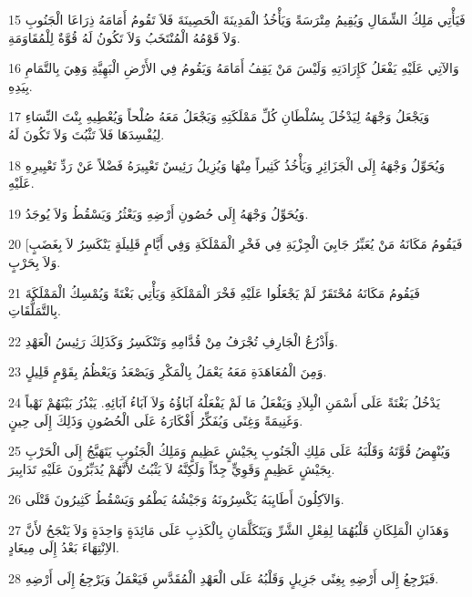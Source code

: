 \par 15 فَيَأْتِي مَلِكُ الشِّمَالِ وَيُقِيمُ مِتْرَسَةً وَيَأْخُذُ الْمَدِينَةَ الْحَصِينَةَ فَلاَ تَقُومُ أَمَامَهُ ذِرَاعَا الْجَنُوبِ وَلاَ قَوْمُهُ الْمُنْتَخَبُ وَلاَ تَكُونُ لَهُ قُوَّةٌ لِلْمُقَاوَمَةِ.
\par 16 وَالآتِي عَلَيْهِ يَفْعَلُ كَإِرَادَتِهِ وَلَيْسَ مَنْ يَقِفُ أَمَامَهُ وَيَقُومُ فِي الأَرْضِ الْبَهِيَّةِ وَهِيَ بِالتَّمَامِ بِيَدِهِ.
\par 17 وَيَجْعَلُ وَجْهَهُ لِيَدْخُلَ بِسُلْطَانِ كُلِّ مَمْلَكَتِهِ وَيَجْعَلُ مَعَهُ صُلْحاً وَيُعْطِيهِ بِنْتَ النِّسَاءِ لِيُفْسِدَهَا فَلاَ تَثْبُتَ وَلاَ تَكُونَ لَهُ.
\par 18 وَيُحَوِّلُ وَجْهَهُ إِلَى الْجَزَائِرِ وَيَأْخُذُ كَثِيراً مِنْهَا وَيُزِيلُ رَئِيسٌ تَعْيِيرَهُ فَضْلاً عَنْ رَدِّ تَعْيِيرِهِ عَلَيْهِ.
\par 19 وَيُحَوِّلُ وَجْهَهُ إِلَى حُصُونِ أَرْضِهِ وَيَعْثُرُ وَيَسْقُطُ وَلاَ يُوجَدُ.
\par 20 [فَيَقُومُ مَكَانَهُ مَنْ يُعَبِّرُ جَابِيَ الْجِزْيَةِ فِي فَخْرِ الْمَمْلَكَةِ وَفِي أَيَّامٍ قَلِيلَةٍ يَنْكَسِرُ لاَ بِغَضَبٍ وَلاَ بِحَرْبٍ.
\par 21 فَيَقُومُ مَكَانَهُ مُحْتَقَرٌ لَمْ يَجْعَلُوا عَلَيْهِ فَخْرَ الْمَمْلَكَةِ وَيَأْتِي بَغْتَةً وَيُمْسِكُ الْمَمْلَكَةَ بِالتَّمَلُّقَاتِ.
\par 22 وَأَذْرُعُ الْجَارِفِ تُجْرَفُ مِنْ قُدَّامِهِ وَتَنْكَسِرُ وَكَذَلِكَ رَئِيسُ الْعَهْدِ.
\par 23 وَمِنَ الْمُعَاهَدَةِ مَعَهُ يَعْمَلُ بِالْمَكْرِ وَيَصْعَدُ وَيَعْظُمُ بِقَوْمٍ قَلِيلٍ.
\par 24 يَدْخُلُ بَغْتَةً عَلَى أَسْمَنِ الْبِلاَدِ وَيَفْعَلُ مَا لَمْ يَفْعَلْهُ آبَاؤُهُ وَلاَ آبَاءُ آبَائِهِ. يَبْذُرُ بَيْنَهُمْ نَهْباً وَغَنِيمَةً وَغِنًى وَيُفَكِّرُ أَفْكَارَهُ عَلَى الْحُصُونِ وَذَلِكَ إِلَى حِينٍ.
\par 25 وَيُنْهِضُ قُوَّتَهُ وَقَلْبَهُ عَلَى مَلِكِ الْجَنُوبِ بِجَيْشٍ عَظِيمٍ وَمَلِكُ الْجَنُوبِ يَتَهَيَّجُ إِلَى الْحَرْبِ بِجَيْشٍ عَظِيمٍ وَقَوِيٍّ جِدّاً وَلَكِنَّهُ لاَ يَثْبُتُ لأَنَّهُمْ يُدَبِّرُونَ عَلَيْهِ تَدَابِيرَ.
\par 26 وَالآكِلُونَ أَطَايِبَهُ يَكْسِرُونَهُ وَجَيْشُهُ يَطْمُو وَيَسْقُطُ كَثِيرُونَ قَتْلَى.
\par 27 وَهَذَانِ الْمَلِكَانِ قَلْبُهُمَا لِفِعْلِ الشَّرِّ وَيَتَكَلَّمَانِ بِالْكَذِبِ عَلَى مَائِدَةٍ وَاحِدَةٍ وَلاَ يَنْجَحُ لأَنَّ الاِنْتِهَاءَ بَعْدُ إِلَى مِيعَادٍ.
\par 28 فَيَرْجِعُ إِلَى أَرْضِهِ بِغِنًى جَزِيلٍ وَقَلْبُهُ عَلَى الْعَهْدِ الْمُقَدَّسِ فَيَعْمَلُ وَيَرْجِعُ إِلَى أَرْضِهِ.
